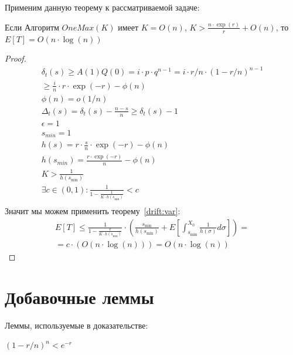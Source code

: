 \documentclass[times]{itmo-student-thesis}
\begin{document}
    Применим данную теорему к рассматриваемой задаче: \\

    \begin{theorem}
        Если Алгоритм $OneMax(K)$ имеет
        $K = O(n)$, $K > \frac{n \cdot \exp(r)}{r} + O(n)$, то
        $E[T] = O(n \cdot \log(n))$
    \end{theorem}
    \begin{proof}
        \begin{gather*}
            \delta_t(s) \geq A(1)Q(0) = i \cdot p \cdot q^{n - 1} = i \cdot r/n \cdot (1 - r/n)^{n - 1} \\
            \geq \frac{i}{n} \cdot r \cdot \exp(-r) - \phi(n) \\
            \phi(n) = o(1/n) \\
            \Delta_t(s) = \delta_t(s) - \frac{n - s}{n} \geq \delta_t(s) - 1 \\
            \epsilon = 1\\
            s_{min} = 1 \\
            h(s) = r \cdot \frac{s}{n} \cdot \exp(-r) - \phi(n) \\
            h(s_{min}) = \frac{r \cdot \exp(-r)}{n} - \phi(n) \\
            K > \frac{1}{h(s_{\min})} \\
            \exists c \in (0, 1): \frac{1}{1 - \frac{1}{K \cdot h(s_{\min})}} < c \\
        \end{gather*}
        Значит мы можем применить теорему~\eqref{drift:var}:
        \begin{gather*}
            E[T] \leq \frac{1}{1 - \frac{\epsilon}{K \cdot h(s_{\min})}} \cdot (\frac{s_{\min}}{h(s_{\min})} + E[\int_{s_{\min}}^{X_0}\frac{1}{h(\sigma)}d\sigma]) = \\
            = c \cdot (O(n \cdot \log(n))) = O(n \cdot \log(n))
        \end{gather*}

    \end{proof}


    \section{Добавочные леммы}

    Леммы, используемые в доказательстве:
    \begin{lemma}
        \label{exp:less}
        $(1 - r/n)^n < e^{-r}$
    \end{lemma}
\end{document}
